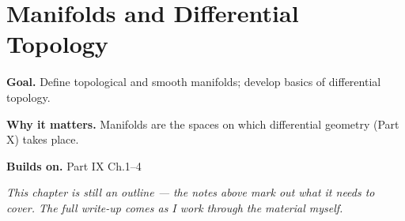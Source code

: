 \chapter{Manifolds and Differential Topology}
\label{ch:09-topology-07}

\begin{chapterintro}
\textbf{Goal.} Define topological and smooth manifolds; develop basics of differential topology.

\textbf{Why it matters.} Manifolds are the spaces on which differential geometry (Part X) takes place.

\textbf{Builds on.} Part IX Ch.1–4
\end{chapterintro}

\textit{This chapter is still an outline --- the notes above mark out what it needs to cover. The full write-up comes as I work through the material myself.}
